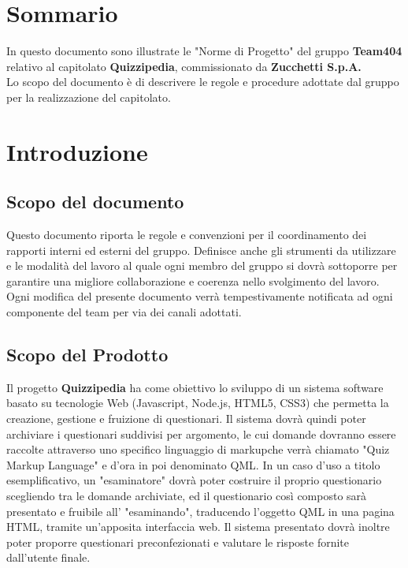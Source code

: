 \documentclass[a4paper,11pt]{article}
\begin{document}
	\newpage
	\section*{Sommario}
		In questo documento sono illustrate le "Norme di Progetto" del gruppo \textbf{Team404} relativo al capitolato \textbf{Quizzipedia}, commissionato da \textbf{Zucchetti S.p.A.} \\
		Lo scopo del documento è di descrivere le regole e procedure adottate dal gruppo per la realizzazione del capitolato. 
	\newpage
	\section{Introduzione}
	
		\subsection{Scopo del documento}
			Questo documento riporta le regole e convenzioni per il coordinamento dei rapporti interni ed esterni del gruppo. Definisce anche gli strumenti da utilizzare e le modalit\`a del lavoro al quale ogni membro del gruppo si dovr\`a sottoporre per garantire una migliore collaborazione e coerenza nello svolgimento del lavoro.\\
		Ogni modifica del presente documento  verr\`a tempestivamente notificata ad ogni componente del team per via dei canali adottati.
		\subsection{Scopo del Prodotto}
			Il progetto \textbf{Quizzipedia} ha come obiettivo lo sviluppo di un sistema software basato su tecnologie Web (Javascript\addglos, Node.js\addglos, HTML5\addglos, CSS3\addglos) che permetta la creazione, gestione e fruizione di questionari. Il sistema dovrà quindi poter archiviare i questionari suddivisi per argomento, le cui domande dovranno essere raccolte attraverso uno specifico linguaggio di markup\addglos che verrà chiamato "Quiz Markup Language" e d'ora in poi denominato QML\addglos. In un caso d'uso a titolo esemplificativo, un "esaminatore" dovrà poter costruire il proprio questionario scegliendo tra le domande archiviate, ed il questionario così composto sarà presentato e fruibile all' "esaminando", traducendo l'oggetto QML in una pagina HTML\addglos, tramite un'apposita interfaccia web. Il sistema presentato dovrà inoltre poter proporre questionari preconfezionati e valutare le risposte fornite dall'utente finale.	\\
\end{document}
